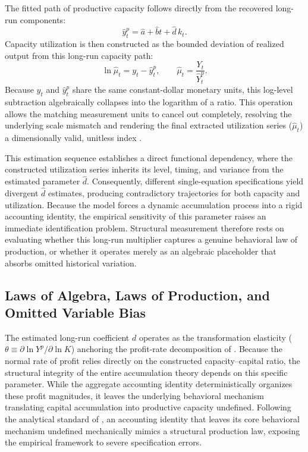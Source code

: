 \documentclass[11pt]{article}
\begin{document}
The fitted path of productive capacity follows directly from the recovered long-run components:
\begin{equation}
\label{eq:fitted_capacity}
\hat{y}^p_t = \hat{a} + \hat{b}t + \hat{d}\,k_t.
\end{equation}
Capacity utilization is then constructed as the bounded deviation of realized output from this long-run capacity path:
\begin{equation}
\label{eq:constructed_utilization}
\ln \hat{\mu}_t = y_t - \hat{y}^p_t,
\qquad
\hat{\mu}_t = \frac{Y_t}{\hat{Y}^p_t}.
\end{equation}
Because $y_t$ and $\hat{y}^p_t$ share the same constant-dollar monetary units, this log-level subtraction algebraically collapses into the logarithm of a ratio. This operation allows the matching measurement units to cancel out completely, resolving the underlying scale mismatch and rendering the final extracted utilization series ($\hat{\mu}_t$) a dimensionally valid, unitless index \citep{Basu2022dimensional}.

This estimation sequence establishes a direct functional dependency, where the constructed utilization series inherits its level, timing, and variance from the estimated parameter $\hat{d}$. Consequently, different single-equation specifications yield divergent $\hat{d}$ estimates, producing contradictory trajectories for both capacity and utilization. Because the model forces a dynamic accumulation process into a rigid accounting identity, the empirical sensitivity of this parameter raises an immediate identification problem. Structural measurement therefore rests on evaluating whether this long-run multiplier captures a genuine behavioral law of production, or whether it operates merely as an algebraic placeholder that absorbs omitted historical variation.

\subsection{Laws of Algebra, Laws of Production, and Omitted Variable Bias}

The estimated long-run coefficient $d$ operates as the transformation elasticity ($\theta \equiv \partial \ln Y^p / \partial \ln K$) anchoring the profit-rate decomposition of \citet{Shaikh2016}. Because the normal rate of profit relies directly on the constructed capacity--capital ratio, the structural integrity of the entire accumulation theory depends on this specific parameter. While the aggregate accounting identity deterministically organizes these profit magnitudes, it leaves the underlying behavioral mechanism translating capital accumulation into productive capacity undefined. Following the analytical standard of \citet{Shaikh1974}, an accounting identity that leaves its core behavioral mechanism undefined mechanically mimics a structural production law, exposing the empirical framework to severe specification errors.
\end{document}
